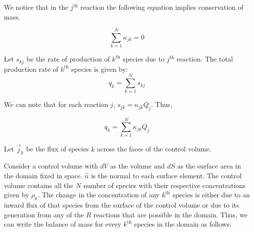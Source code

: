 

We notice that in the $j^\text{th}$ reaction the following equation implies
conservation of mass.

$$ \sum_{k=1}^{N}{\kappa_{jk}} = 0$$

Let $s_{kj}$ be the rate of production of $k^\text{th}$ species due to
$j^\text{th}$ reaction. 
The total production rate of $k^\text{th}$ species is given by:
$$ q_k = \sum_{k=1}^{N}{s_{kj}} $$

We can note that for each reaction $j$, $s_{jk} = \kappa_{jk}Q_j$. Thus,

$$ q_k = \sum_{k=1}^{N}{\kappa_{jk}Q_j} $$

Let $\vec{j}_k$ be the flux of species $k$ across the faces of the control
volume.

Consider a control volume with $dV$ as the volume and $dS$ as the surface area
in the domain fixed in space. $\hat{n}$ is the normal to each surface element.
The control
volume contains all the $N$ number of species with their respective
concentrations given by $\rho_k$. The change in the concentration of any
$k^\text{th}$ species is either due to an inward flux of that species from the
surface of the control volume or due to its generation from any of the $R$
reactions that are possible in the domain. Thus, we can write the balance of
mass for every $k^\text{th}$ species in the domain as follows:

